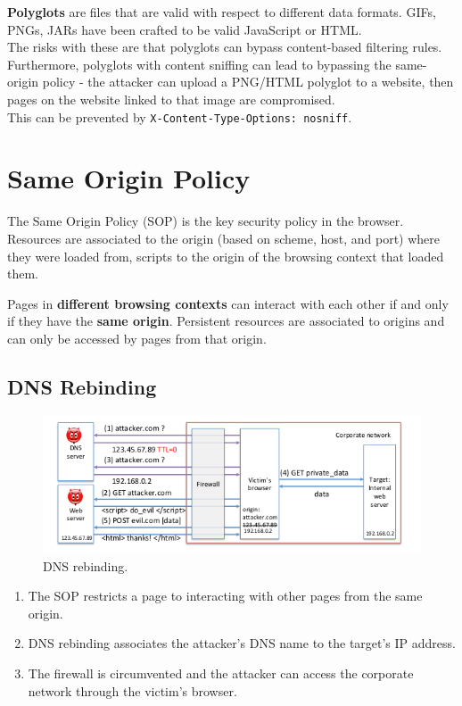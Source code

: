 \documentclass[11pt]{article}
\begin{document}
\textbf{Polyglots} are files that are valid with respect to different data formats.
GIFs, PNGs, JARs have been crafted to be valid JavaScript or HTML. \\

The risks with these are that polyglots can bypass content-based filtering rules.
Furthermore, polyglots with content sniffing can lead to bypassing the same-origin policy - the attacker can upload a PNG/HTML polyglot to a website, then pages on the website linked to that image are compromised. \\

This can be prevented by \texttt{X-Content-Type-Options: nosniff}.

\section{Same Origin Policy}
The Same Origin Policy (SOP) is the key security policy in the browser.
Resources are associated to the origin (based on scheme, host, and port) where they were loaded from, scripts to the origin of the browsing context that loaded them.

Pages in \textbf{different browsing contexts} can interact with each other if and only if they have the \textbf{same origin}.
Persistent resources are associated to origins and can only be accessed by pages from that origin.

\subsection{DNS Rebinding}
\begin{figure}[htb!]
  \centering
  \caption{DNS rebinding.}
  \includegraphics[scale=0.5]{dnsrebinding}
\end{figure}
\begin{enumerate}
  \item The SOP restricts a page to interacting with other pages from the same origin.
  \item DNS rebinding associates the attacker's DNS name to the target's IP address.
  \item The firewall is circumvented and the attacker can access the corporate network through the victim's browser.
\end{enumerate}
\end{document}
